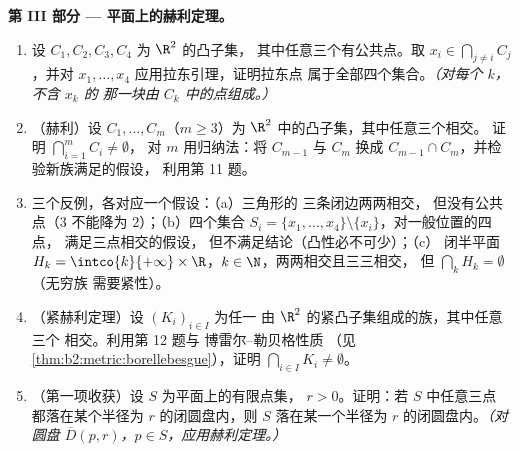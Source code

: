 \begin{problem}
\medskip
\noindent\textbf{第 III 部分 --- 平面上的赫利定理。}
\begin{enumerate}[resume]
  \item 设 $C_1, C_2, C_3, C_4$ 为 $\R^2$ 的凸子集，
        其中任意三个有公共点。取 $x_i \in
        \bigcap_{j \neq i} C_j$，并对
        $x_1, \dots, x_4$ 应用拉东引理，证明拉东点
        属于全部四个集合。\emph{（对每个 $k$，不含 $x_k$ 的
        那一块由 $C_k$ 中的点组成。）}
  \item （赫利）设 $C_1, \dots, C_m$（$m \geq 3$）为
        $\R^2$ 中的凸子集，其中任意三个相交。
        证明 $\bigcap_{i=1}^m C_i \neq \emptyset$，
        对 $m$ 用归纳法：将 $C_{m-1}$ 与 $C_m$ 换成
        $C_{m-1} \cap C_m$，并检验新族满足的假设，
        利用第 11 题。
  \item 三个反例，各对应一个假设：（a）三角形的
        三条闭边两两相交，
        但没有公共点（$3$ 不能降为
        $2$）；（b）四个集合 $S_i = \{x_1, \dots, x_4\}
        \setminus \{x_i\}$，对一般位置的四点，
        满足三点相交的假设，
        但不满足结论（凸性必不可少）；（c）
        闭半平面 $H_k = \intco{k}{+\infty} \times
        \R$，$k \in \N$，两两相交且三三相交，
        但 $\bigcap_k H_k = \emptyset$（无穷族
        需要紧性）。
  \item （紧赫利定理）设 $(K_i)_{i \in I}$ 为任一
        由 $\R^2$ 的紧凸子集组成的族，其中任意三个
        相交。利用第 12 题与
        博雷尔–勒贝格性质
        （见\cref{thm:b2:metric:borellebesgue}），证明
        $\bigcap_{i \in I} K_i \neq \emptyset$。
  \item （第一项收获）设 $S$ 为平面上的有限点集，
        $r > 0$。证明：若 $S$ 中任意三点
        都落在某个半径为 $r$ 的闭圆盘内，则 $S$
        落在某一个半径为 $r$ 的闭圆盘内。\emph{（对圆盘
        $\overline D(p, r)$，$p \in S$，应用赫利定理。）}
\end{enumerate}


\end{problem}
